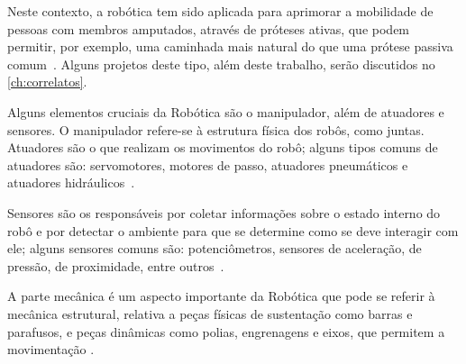Neste contexto, a robótica tem sido aplicada para aprimorar a mobilidade de pessoas com membros amputados, através de próteses ativas, que podem permitir, por exemplo, uma caminhada mais natural do que uma prótese passiva comum~\cite{dedic:2011}. Alguns projetos deste tipo, além deste trabalho, serão discutidos no \autoref{ch:correlatos}.

Alguns elementos cruciais da Robótica são o manipulador, além de atuadores e sensores. O manipulador refere-se à estrutura física dos robôs, como juntas. Atuadores são o que realizam os movimentos do robô; alguns tipos comuns de atuadores são: servomotores, motores de passo, atuadores pneumáticos e atuadores hidráulicos~\cite{niku:2010robotics_intro}.

Sensores são os responsáveis por coletar informações sobre o estado interno do robô e por detectar o ambiente para que se determine como se deve interagir com ele; alguns sensores comuns são: potenciômetros, sensores de aceleração, de pressão, de proximidade, entre outros~\cite{niku:2010robotics_intro}.

A parte mecânica é um aspecto importante da Robótica que pode se referir à mecânica estrutural, relativa a peças físicas de sustentação como barras e parafusos, e peças dinâmicas como polias, engrenagens e eixos, que permitem a movimentação \cite{modelix:2010guia_robotica}.




